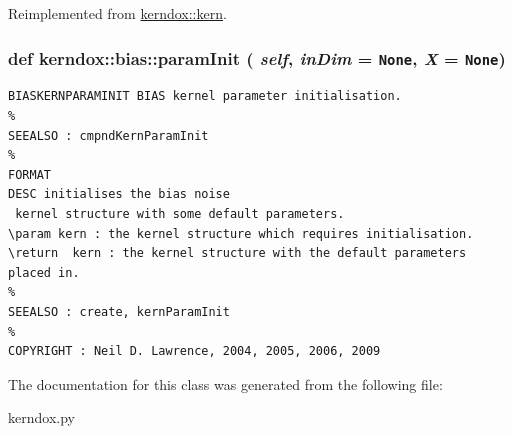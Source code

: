 Reimplemented from \hyperlink{classkerndox_1_1kern}{kerndox::kern}.\hypertarget{classkerndox_1_1bias_7fa82a25834e1b5253409e86e2dbba02}{
\subsubsection[{paramInit}]{\setlength{\rightskip}{0pt plus 5cm}def kerndox::bias::paramInit ( {\em self}, \/   {\em inDim} = {\tt None}, \/   {\em X} = {\tt None})}}
\label{classkerndox_1_1bias_7fa82a25834e1b5253409e86e2dbba02}




\footnotesize\begin{verbatim}BIASKERNPARAMINIT BIAS kernel parameter initialisation.
%
SEEALSO : cmpndKernParamInit
%
FORMAT
DESC initialises the bias noise
 kernel structure with some default parameters.
\param kern : the kernel structure which requires initialisation.
\return  kern : the kernel structure with the default parameters placed in.
%
SEEALSO : create, kernParamInit
%
COPYRIGHT : Neil D. Lawrence, 2004, 2005, 2006, 2009

\end{verbatim}
\normalsize
 

The documentation for this class was generated from the following file:\begin{CompactItemize}
\item 
kerndox.py\end{CompactItemize}
